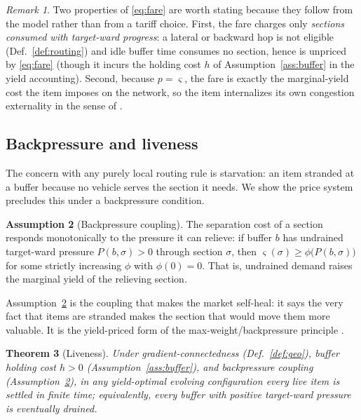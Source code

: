 \documentclass[11pt,twocolumn,a4paper]{article}
\newtheorem{theorem}{Theorem}[section]
\theoremstyle{definition}
\newtheorem{assumption}[theorem]{Assumption}
\theoremstyle{remark}
\newtheorem{remark}[theorem]{Remark}
\newcommand{\sep}{\varsigma}
\begin{document}
\begin{remark}
Two properties of \eqref{eq:fare} are worth stating because they follow from the model rather than from a tariff choice. First, the fare charges only \emph{sections consumed with target-ward progress}: a lateral or backward hop is not eligible (Def.~\ref{def:routing}) and idle buffer time consumes no section, hence is unpriced by \eqref{eq:fare} (though it incurs the holding cost $h$ of Assumption~\ref{ass:buffer} in the yield accounting). Second, because $p=\sep$, the fare is exactly the marginal-yield cost the item imposes on the network, so the item internalizes its own congestion externality in the sense of \cite{vickrey1969,beckmann1956}.
\end{remark}

\subsection{Backpressure and liveness}

The concern with any purely local routing rule is starvation: an item stranded at a buffer because no vehicle serves the section it needs. We show the price system precludes this under a backpressure condition.

\begin{assumption}[Backpressure coupling]
\label{ass:backpressure}
The separation cost of a section responds monotonically to the pressure it can relieve: if buffer $b$ has undrained target-ward pressure $P(b,\sigma)>0$ through section $\sigma$, then $\sep(\sigma) \ge \phi\big(P(b,\sigma)\big)$ for some strictly increasing $\phi$ with $\phi(0)=0$. That is, undrained demand raises the marginal yield of the relieving section.
\end{assumption}

Assumption~\ref{ass:backpressure} is the coupling that makes the market self-heal: it says the very fact that items are stranded makes the section that would move them more valuable. It is the yield-priced form of the max-weight/backpressure principle \cite{tassiulas1992,neely2010}.

\begin{theorem}[Liveness]
\label{thm:liveness}
Under gradient-connectedness (Def.~\ref{def:geo}), buffer holding cost $h>0$ (Assumption~\ref{ass:buffer}), and backpressure coupling (Assumption~\ref{ass:backpressure}), in any yield-optimal evolving configuration every live item is settled in finite time; equivalently, every buffer with positive target-ward pressure is eventually drained.
\end{theorem}
\end{document}
